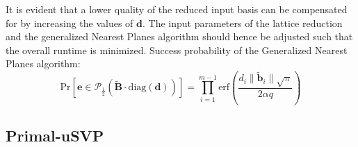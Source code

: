 It is evident that a lower quality of the reduced input basis can be compensated for by increasing the values of $\mathbf{d}$. The input parameters of the lattice reduction and the generalized Nearest Planes algorithm should hence be adjusted such that the overall runtime is minimized. %
Success probability of the Generalized Nearest Planes algorithm:
\begin{equation}
  \text{Pr}\left[ \mathbf{e} \in \mathcal{P}_{\frac{1}{2}}(\tilde{\mathbf{B}} \cdot \text{diag}(\mathbf{d}))\right] = \prod_{i=1}^{m-1} \text{erf}\left(\frac{d_i \|\tilde{\mathbf{b}}_i\| \sqrt{\pi}}{2\alpha q}\right)
\end{equation} %






\subsection[Primal-uSVP]{Primal-uSVP \cite{ADPS16, BG14}} %






